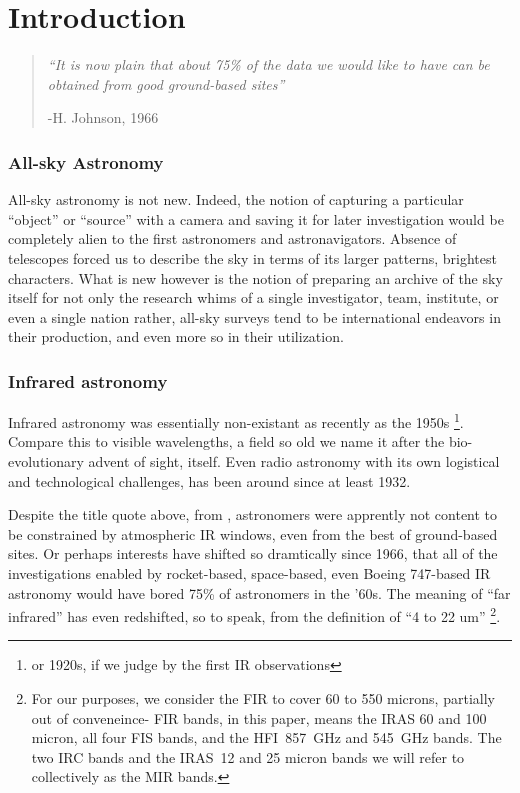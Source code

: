 \chapter{Introduction}
  \label{ch:intro}
  \begin{quotation}
    \small
    \textit{``It is now plain that about 75\% of the data we would like to have can be obtained from good ground-based sites''}

    -H. Johnson, 1966
  \end{quotation}

\subsection{All-sky Astronomy}


    All-sky astronomy is not new. Indeed, the notion of capturing a particular ``object'' or ``source'' with a camera and saving it for later investigation would be completely alien to the first astronomers and astronavigators. Absence of telescopes forced us to describe the sky in terms of its larger patterns, brightest characters. What is new however is the notion of preparing an archive of the sky itself for not only the research whims of a single investigator, team, institute, or even a single nation\- rather, all-sky surveys tend to be international endeavors in their production, and even more so in their utilization.


  \subsection{Infrared astronomy}

  Infrared astronomy was essentially non-existant as recently as the 1950s \cite{johnson66} \footnote{or 1920s, if we judge by the first IR observations}. Compare this to visible wavelengths, a field so old we name it after the bio-evolutionary advent of sight, itself. Even radio astronomy with its own logistical and technological challenges, has been around since at least 1932.


  Despite the title quote above, from \citep{johnson66}, astronomers were apprently not content to be constrained by atmospheric IR windows, even from the best of ground-based sites. Or perhaps interests have shifted so dramtically since 1966, that all of the investigations enabled by rocket-based, space-based, even Boeing 747-based IR astronomy would have bored 75\% of astronomers in the '60s. The meaning of ``far infrared'' has even redshifted, so to speak, from the \cite{johnson66} definition of ``4 to 22 um''
   \footnote{\footnotesize For our purposes, we consider the FIR to cover 60 to 550 microns, partially out of conveneince- FIR bands, in this paper, means the IRAS 60 and 100 micron, all four FIS bands, and the HFI~857~GHz and 545~GHz bands. The two IRC bands and the IRAS~12 and 25 micron bands we will refer to collectively as the MIR bands.}.

